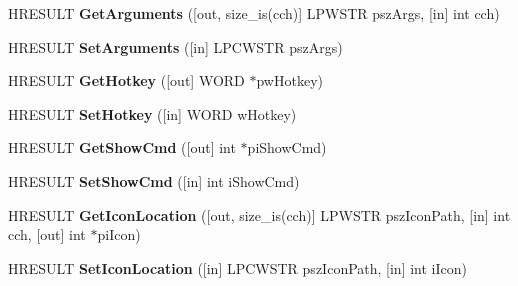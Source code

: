 \begin{DoxyCompactItemize}
\item 
\mbox{\label{interface_i_shell_link_w_a9e853f567c6132305114d523592c2fed}} 
H\+R\+E\+S\+U\+LT {\bfseries Get\+Arguments} (\mbox{[}out, size\+\_\+is(cch)\mbox{]} L\+P\+W\+S\+TR psz\+Args, \mbox{[}in\mbox{]} int cch)
\item 
\mbox{\label{interface_i_shell_link_w_a0cb9d4526eadec3422831ede2328ea7b}} 
H\+R\+E\+S\+U\+LT {\bfseries Set\+Arguments} (\mbox{[}in\mbox{]} L\+P\+C\+W\+S\+TR psz\+Args)
\item 
\mbox{\label{interface_i_shell_link_w_a8f6d679b34622157765bc1cca7c315b1}} 
H\+R\+E\+S\+U\+LT {\bfseries Get\+Hotkey} (\mbox{[}out\mbox{]} W\+O\+RD $\ast$pw\+Hotkey)
\item 
\mbox{\label{interface_i_shell_link_w_a84ca3a17971d92fa840125f0f9a26d65}} 
H\+R\+E\+S\+U\+LT {\bfseries Set\+Hotkey} (\mbox{[}in\mbox{]} W\+O\+RD w\+Hotkey)
\item 
\mbox{\label{interface_i_shell_link_w_a60b20804a8cdb45888ea357c28f04457}} 
H\+R\+E\+S\+U\+LT {\bfseries Get\+Show\+Cmd} (\mbox{[}out\mbox{]} int $\ast$pi\+Show\+Cmd)
\item 
\mbox{\label{interface_i_shell_link_w_a7e566df33e6afcceea21835bcbb8ec77}} 
H\+R\+E\+S\+U\+LT {\bfseries Set\+Show\+Cmd} (\mbox{[}in\mbox{]} int i\+Show\+Cmd)
\item 
\mbox{\label{interface_i_shell_link_w_a6bce4f5106773c68db13d572668c2503}} 
H\+R\+E\+S\+U\+LT {\bfseries Get\+Icon\+Location} (\mbox{[}out, size\+\_\+is(cch)\mbox{]} L\+P\+W\+S\+TR psz\+Icon\+Path, \mbox{[}in\mbox{]} int cch, \mbox{[}out\mbox{]} int $\ast$pi\+Icon)
\item 
\mbox{\label{interface_i_shell_link_w_a7e508b15872875ddd3899dd14ff2bdfe}} 
H\+R\+E\+S\+U\+LT {\bfseries Set\+Icon\+Location} (\mbox{[}in\mbox{]} L\+P\+C\+W\+S\+TR psz\+Icon\+Path, \mbox{[}in\mbox{]} int i\+Icon)
\item 
\mbox{\label{interface_i_shell_link_w_ad63ae70417b96410d01ed5b52cb6e4fb}} 

\end{DoxyCompactItemize}
